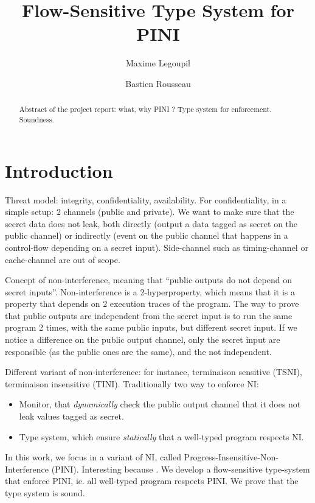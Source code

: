 \documentclass[10pt]{article}
\title{
   Flow-Sensitive Type System for PINI
}
\author{Maxime Legoupil \and Bastien Rousseau }
\begin{document}
\maketitle

\begin{abstract}
   Abstract of the project report: what, why PINI ? Type system for enforcement. Soundness.
\end{abstract}

\thispagestyle{empty}

\section{Introduction}
\label{sec:intro}

Threat model: integrity, confidentiality, availability. For confidentiality, in a simple setup: 2
channels (public and private). We want to make sure that the secret data does not leak, both
directly (output a data tagged as secret on the public channel) or indirectly (event on the public
channel that happens in a control-flow depending on a secret input).
Side-channel such as timing-channel or cache-channel are out of scope.

Concept of non-interference, meaning that ``public outputs do not depend on secret inputs''.
Non-interference is a 2-hyperproperty, which means that it is a property that depends on 2
execution traces of the program. The way to prove that public outputs are independent from the
secret input is to run the same program 2 times, with the same public inputs, but different secret
input. If we notice a difference on the public output channel, only the secret input are responsible
(as the public ones are the same), and the not independent.

Different variant of non-interference: for instance, terminaison sensitive (TSNI), terminaison insensitive
(TINI).
Traditionally two way to enforce NI:
\begin{itemize}
  \item Monitor, that \emph{dynamically} check the public output channel that it does not leak
        values tagged as secret.
  \item Type system, which ensure \emph{statically} that a well-typed program respects NI.
\end{itemize}


In this work, we focus in a variant of NI, called Progress-Insensitive-Non-Interference (PINI).
Interesting because .
We develop a flow-sensitive type-system that enforce PINI, ie. all well-typed program respects PINI.
We prove that the type system is sound.
\end{document}

